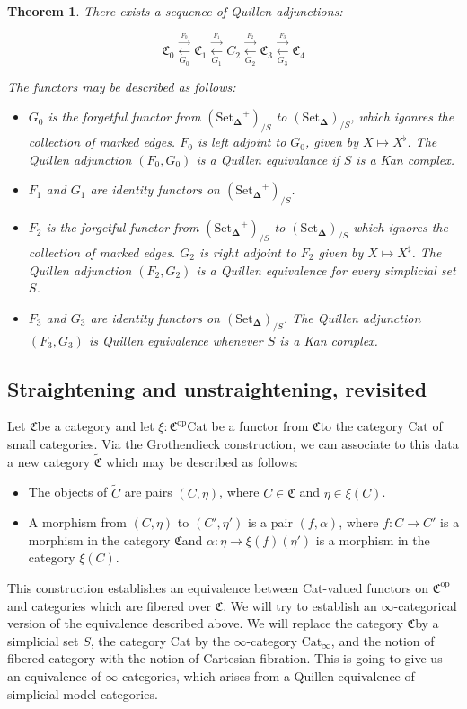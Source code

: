 \documentclass[12pt]{amsart}
\newcommand{\8}{\ensuremath{\infty}}
\newcommand{\C}{\ensuremath{\mathfrak{C}}}
\newcommand{\SSet}{\ensuremath{\text{Set}_{\boldsymbol{\Delta}}}}
\newcommand{\op}[1]{\ensuremath{{#1}^{\text{op}}}}
\newcommand{\adj}[2]{\ensuremath{\overset{\overset{#1}{ \rightarrow}}{\underset{#2}{\leftarrow}}}}
\newtheorem{theorem}{Theorem}
\begin{document}
\begin{theorem}
  There exists a sequence of Quillen adjunctions:

  $$
    \C_0 \adj{F_0}{G_0} \C_1 \adj{F_1}{G_1} C_2 \adj{F_2}{G_2} \C_3 \adj{F_3}{G_3} \C_4
  $$

  The functors may be described as follows:
  \begin{itemize}
    \item[(A0)] $G_0$ is the forgetful functor from $(\SSet^+)_{/S}$ to $(\SSet)_{/S}$, which igonres the collection of marked edges. $F_0$ is left adjoint to $G_0$, given by $X \mapsto X^\flat$. The Quillen adjunction $(F_0, G_0)$ is a Quillen equivalance if $S$ is a Kan complex.
    \item[(A1)] $F_1$ and $G_1$ are identity functors on $(\SSet^+)_{/S}$.
    \item[(A2)]  $F_2$ is the forgetful functor from $(\SSet^+)_{/S}$ to $(\SSet)_{/S}$ which ignores the collection of marked edges. $G_2$ is right adjoint to $F_2$ given by $X \mapsto X^\sharp$. The Quillen adjunction $(F_2, G_2)$ is a Quillen equivalence for every simplicial set $S$.
    \item[(A3)]  $F_3$ and $G_3$ are identity functors on $(\SSet)_{/S}$. The Quillen adjunction $(F_3, G_3)$ is Quillen equivalence whenever $S$ is a Kan complex.
  \end{itemize}
\end{theorem}

\subsection{Straightening and unstraightening, revisited}
Let \C be a category and let $\xi: \op\C\text{Cat}$ be a functor from \C to the category $\text{Cat}$ of small categories. Via the Grothendieck construction, we can associate to this data a new category $\tilde{\C}$ which may be described as follows:

\begin{itemize}
  \item The objects of $\tilde{C}$ are pairs $(C, \eta)$, where $C \in \C$ and $\eta \in \xi(C)$.
  \item A morphism from $(C, \eta)$ to $(C', \eta')$ is a pair $(f, \alpha)$, where $f: C \rightarrow C'$ is a morphism in the category \C and $\alpha: \eta \rightarrow \xi(f)(\eta')$ is a morphism in the category $\xi(C)$.
\end{itemize}

This construction establishes an equivalence between Cat-valued functors on $\op\C$ and categories which are fibered over $\C$. We will try to establish an \8-categorical version of the equivalence described above. We will replace the category \C by a simplicial set $S$, the category Cat by the \8-category $\text{Cat}_{\8}$, and the notion of fibered category with the notion of Cartesian fibration. This is going to give us an equivalence of \8-categories, which arises from a Quillen equivalence of simplicial model categories.
\end{document}
